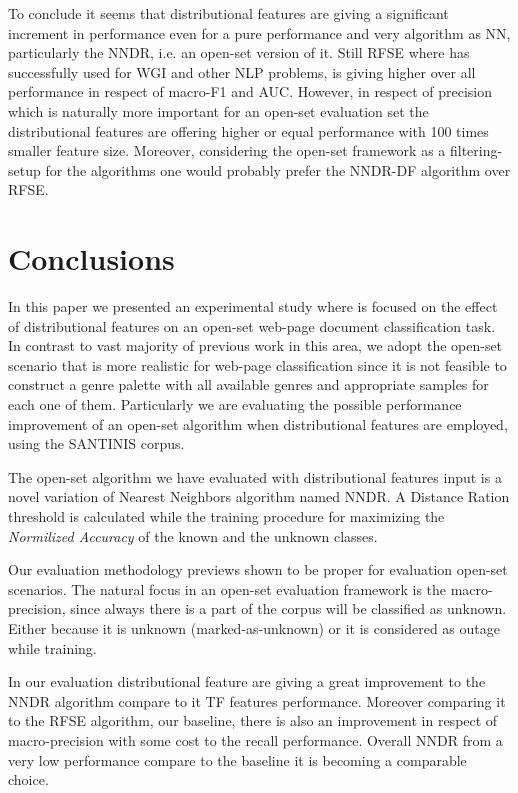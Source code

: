 \documentclass[runningheads]{llncs}
\begin{document}
To conclude it seems that distributional features are giving a significant increment in performance even for a pure performance and very algorithm as NN, particularly the NNDR, i.e. an open-set version of it. Still RFSE where has successfully used for  WGI and other NLP problems, is giving higher over all performance in respect of macro-F1 and AUC. However, in respect of precision which is naturally more important for an open-set evaluation set the distributional features are offering higher or equal performance with 100 times smaller feature size. Moreover, considering the open-set framework as a filtering-setup for the algorithms one would probably prefer the NNDR-DF algorithm over RFSE.



\section{Conclusions}\label{sec:conclusions}

In this paper we presented an experimental study where is focused on the effect of distributional features on an open-set web-page document classification task. In contrast to vast majority of previous work in this area, we adopt the open-set scenario that is more realistic for  web-page classification since it is not feasible to construct a genre palette with all available genres and appropriate samples for each one of them. Particularly we are evaluating the possible performance improvement of an open-set algorithm when distributional features are employed, using the SANTINIS corpus.

The open-set algorithm we have evaluated with distributional features input is a novel variation of Nearest Neighbors algorithm named NNDR. A Distance Ration threshold is calculated while the training procedure for maximizing the \textit{Normilized Accuracy} of the known and the unknown classes.

Our evaluation methodology previews shown to be proper for evaluation open-set scenarios. The natural focus in an open-set evaluation framework is the macro-precision, since always there is a part of the corpus will be classified as unknown. Either because it is unknown (marked-as-unknown) or it is considered as outage while training.

In our evaluation distributional feature are giving a great improvement to the NNDR algorithm compare to it TF features performance. Moreover comparing it to the RFSE algorithm, our baseline, there is also an improvement in respect of macro-precision with some cost to the recall performance. Overall NNDR from a very low performance compare to the baseline it is becoming a comparable choice.
\end{document}
